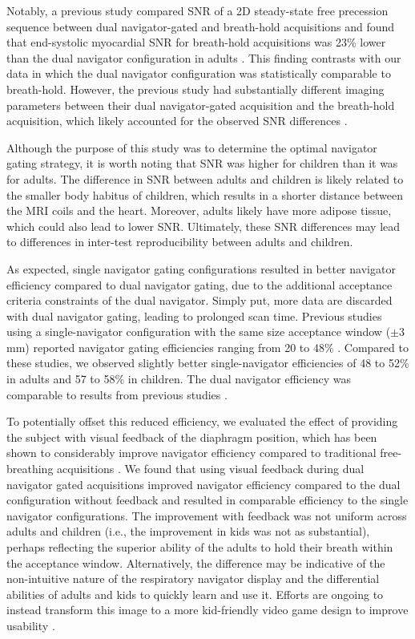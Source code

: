 	Notably, a previous study compared SNR of a 2D steady-state free precession sequence between dual navigator-gated and breath-hold acquisitions and found that end-systolic myocardial SNR for breath-hold acquisitions was 23\% lower than the dual navigator configuration in adults \cite{Peters2008}. This finding contrasts with our data in which the dual navigator configuration was statistically comparable to breath-hold. However, the previous study had substantially different imaging parameters between their dual navigator-gated acquisition and the breath-hold acquisition, which likely accounted for the observed SNR differences \cite{Peters2008}.
	
	Although the purpose of this study was to determine the optimal navigator gating strategy, it is worth noting that SNR was higher for children than it was for adults. The difference in SNR between adults and children is likely related to the smaller body habitus of children, which results in a shorter distance between the MRI coils and the heart. Moreover, adults likely have more adipose tissue, which could also lead to lower SNR. Ultimately, these SNR differences may lead to differences in inter-test reproducibility between adults and children.
	
	As expected, single navigator gating configurations resulted in better navigator efficiency compared to dual navigator gating, due to the additional acceptance criteria constraints of the dual navigator. Simply put, more data are discarded with dual navigator gating, leading to prolonged scan time. Previous studies using a single-navigator configuration with the same size acceptance window ($\pm$3 mm) reported navigator gating efficiencies ranging from 20 to 48\% \cite{Zhong2010a,Feuerlein2009,Abd-Elmoniem2011}. Compared to these studies, we observed slightly better single-navigator efficiencies of 48 to 52\% in adults and 57 to 58\% in children. The dual navigator efficiency was comparable to results from previous studies \cite{Peters2008}.
	
	To potentially offset this reduced efficiency, we evaluated the effect of providing the subject with visual feedback of the diaphragm position, which has been shown to considerably improve navigator efficiency compared to traditional free-breathing acquisitions \cite{Feuerlein2009}. We found that using visual feedback during dual navigator gated acquisitions improved navigator efficiency compared to the dual configuration without feedback and resulted in comparable efficiency to the single navigator configurations. The improvement with feedback was not uniform across adults and children (i.e., the improvement in kids was not as substantial), perhaps reflecting the superior ability of the adults to hold their breath within the acceptance window. Alternatively, the difference may be indicative of the non-intuitive nature of the respiratory navigator display and the differential abilities of adults and kids to quickly learn and use it. Efforts are ongoing to instead transform this image to a more kid-friendly video game design to improve usability \cite{Hamlet2016a}.
	
